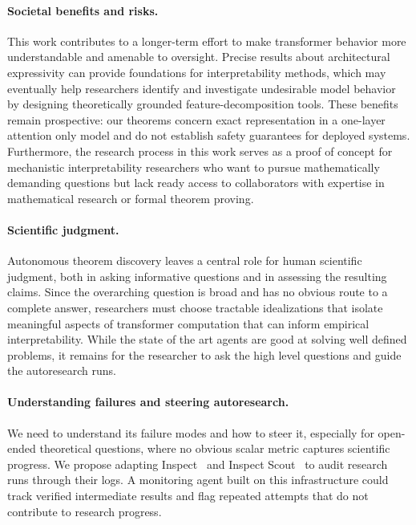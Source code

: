 \documentclass{article}
\theoremstyle{definition}
\theoremstyle{plain}
\begin{document}
\paragraph{Societal benefits and risks.}
This work contributes to a longer-term effort to make transformer behavior more understandable and amenable to oversight. Precise results about architectural expressivity can provide foundations for interpretability methods, which may eventually help researchers identify and investigate undesirable model behavior by designing theoretically grounded feature-decomposition tools. These benefits remain prospective: our theorems concern exact representation in a one-layer attention only model and do not establish safety guarantees for deployed systems. Furthermore, the research process in this work serves as a proof of concept for mechanistic interpretability researchers who want to pursue mathematically demanding questions but lack ready access to collaborators with expertise in mathematical research or formal theorem proving. 

\paragraph{Scientific judgment.}
Autonomous theorem discovery leaves a central role for human scientific judgment, both in asking informative questions and in assessing the resulting claims. Since the overarching question is broad and has no obvious route to a complete answer, researchers must choose tractable idealizations that isolate meaningful aspects of transformer computation that can inform empirical interpretability. While the state of the art agents are good at solving well defined problems, it remains for the researcher to ask the high level questions and guide the autoresearch runs.

\paragraph{Understanding failures and steering autoresearch.}
We need to understand its failure modes and how to steer it, especially for open-ended theoretical questions, where no obvious scalar metric captures scientific progress. We propose adapting Inspect~\citep{aisi2024inspect} and Inspect Scout~\citep{dubois2026loganalysis} to audit research runs through their logs. A monitoring agent built on this infrastructure could track verified intermediate results and flag repeated attempts that do not contribute to research progress.
\end{document}
